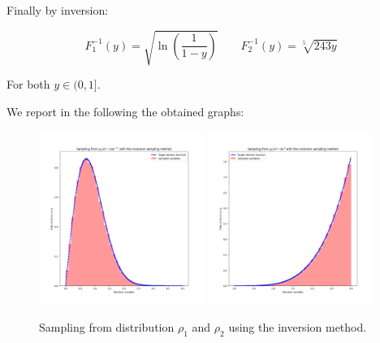 Finally by inversion:

$$ F^{-1}_1(y) = \sqrt{\ln\left(\frac{1}{1-y}\right)} \qquad F^{-1}_2(y)= \sqrt[5]{243 y}$$

For both $y \in (0,1]$.

We report in the following the obtained graphs:

\begin{figure}[H]
\centering
\includegraphics[width=0.48\textwidth]{FIG/exercise_1_images/Figure_1.png}
\hfill
\includegraphics[width=0.48\textwidth]{FIG/exercise_1_images/Figure_2.png}
\caption{Sampling from distribution $\rho_1$ and $\rho_2$ using the inversion method.}
\label{fig:combined_figure}
\end{figure}